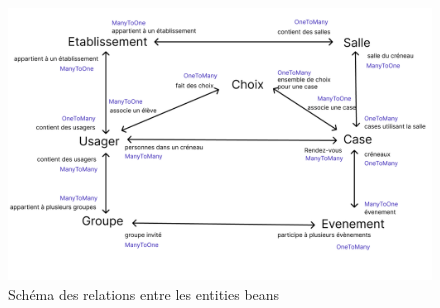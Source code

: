 \documentclass[french]{article}
\begin{document}
    \begin{figure}[h]
        \centering
        \includegraphics[width=\textwidth]{rapport/schema_donnees.png}
        \caption{Schéma des relations entre les entities beans}
        \label{fig:modif_event}
    \end{figure}
    
\end{document}
